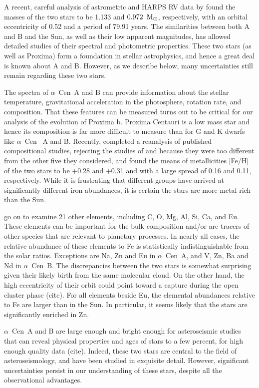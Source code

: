 \documentclass[preprint,12pt]{aastex}
\newcommand{\xxx}[1]{{\color{red} #1}} %
\def\msun{{\rm\,M_\odot}}
\def\acen{{$\alpha$~Cen}}
\begin{document}
A recent, careful analysis of astrometric and HARPS RV data by
\cite{PourbaixBoffin16} found the masses of the two stars to be 1.133
and $0.972~\msun$, respectively, with an orbital eccentricity of 0.52
and a period of 79.91 years. The similarities between both A and B and
the Sun, as well as their low apparent magnitudes, has allowed
detailed studies of their spectral and photometric properties. These
two stars (as well as Proxima) form a foundation in stellar astrophysics,
and hence a great deal is known about A and B. However, as we describe
below, many uncertainties still remain regarding these two stars.

The spectra of \acen~A and B can provide information about the stellar
temperature, gravitational acceleration in the photosphere, rotation
rate, and composition. That these features can be measured turns out
to be critical for our analysis of the evolution of Proxima b. Proxima
Centauri is a low mass star and hence its composition is far more
difficult to measure than for G and K dwarfs like \acen~ A and
B. Recently, \cite{HinkelKane13} completed a reanalysis of published
compositional studies, rejecting the studies of \cite{Laird85} and
\cite{NeuforgeMagain97} because they were too different from the
other five they considered, and found the means of metallicities [Fe/H]
of the two stars to be +0.28 and +0.31 and with a large spread of 0.16
and 0.11, respectively. While it is frustrating that different groups
have arrived at significantly different iron abundances, it is certain
the stars are more metal-rich than the Sun. 

\cite{HinkelKane13} go on to examine 21 other elements, including C,
O, Mg, Al, Si, Ca, and Eu. These elements can be important for the
bulk composition and/or are tracers of other species that are relevant
to planetary processes. In nearly all cases, the relative abundance of
these elements to Fe is statistically indistinguishable from the solar
ratios. Exceptions are Na, Zn and Eu in \acen~A, and V, Zn, Ba
and Nd in \acen~B. The discrepancies between the two stars is
somewhat surprising given their likely birth from the same molecular
cloud. On the other hand, the high eccentricity of their orbit could
point toward a capture during the open cluster phase \xxx{(cite)}. For all
elements beside Eu, the elemental abundances relative to Fe are larger
than in the Sun. In particular, it seems likely that the stars are
significantly enriched in Zn.

\acen~A and B are large enough and bright enough for asteroseismic
studies that can reveal physical properties and ages of stars to a few
percent, for high enough quality data \xxx{(cite)}. Indeed, these two stars
are central to the field of asteroseismology, and have been studied in
exquisite detail. However, significant uncertainties persist in our
understanding of these stars, despite all the observational
advantages.
\end{document}
